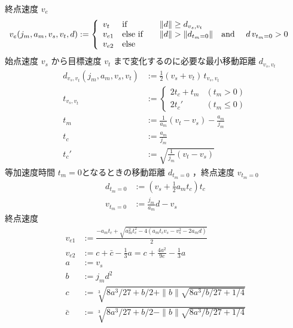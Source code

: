 \documentclass[a5paper]{ltjsarticle}
\begin{document}
終点速度 $v_e$
\begin{align}
    v_e(j_m,a_m,v_s,v_t,d) & :=
    \left\{
    \begin{array}{lll}
        v_t    & \mbox{if\quad}      & \|d\| \geq d_{v_s,v_t}
        \\
        v_{e1} & \mbox{else if\quad} & \|d\| > \|d_{t_m=0}\| \mbox{\quad and \quad} d\, v_{t_m=0} > 0
        \\
        v_{e2} & \mbox{else}
    \end{array}
    \right.
\end{align}
始点速度 $v_s$ から目標速度 $v_t$ まで変化するのに必要な最小移動距離 $d_{v_s,v_t}$
\begin{align}
    d_{v_s,v_t}(j_m,a_m,v_s,v_t) & := \frac{1}{2}(v_s+v_t) \, t_{v_s,v_t}        \\
    t_{v_s,v_t}                  & :=
    \left\{\begin{array}{ll}
        2t_c + t_m & (t_m>0)    \\
        2t_c'      & (t_m\leq0)
    \end{array}\right.
    \\
    t_m                          & := \frac{1}{a_m}(v_t - v_s) - \frac{a_m}{j_m} \\
    t_c                          & := \frac{a_m}{j_m}                            \\
    t_c'                         & := \sqrt{\frac{1}{j_m}(v_t-v_s)}
\end{align}
等加速度時間 $t_m = 0$となるときの移動距離 $d_{t_m=0}$ ，終点速度 $v_{t_m=0}$
\begin{align}
    d_{t_m=0} & := \left( v_s + \frac{1}{2}a_m t_c \right) t_c
    \\
    v_{t_m=0} & := \frac{j_m}{a_m} d - v_s
\end{align}
終点速度
\begin{align}
    v_{e1}  & := \frac{-a_m t_c + \sqrt{a_m^2 t_c^2-4(a_m t_c v_s - v_s^2 - 2a_m d)}}{2}
    \\
    v_{e2}  & := c +\bar{c} - \frac{1}{3} a = c + \frac{4a^2}{9c} - \frac{1}{3} a
    \\
    a       & := v_s
    \\
    b       & := j_m d^2
    \\
    c       & := \sqrt[3]{8a^3/27+b/2 + \|b\|\sqrt{8a^3/b/27+1/4}}
    \\
    \bar{c} & := \sqrt[3]{8a^3/27+b/2 - \|b\|\sqrt{8a^3/b/27+1/4}}
\end{align}
\end{document}
